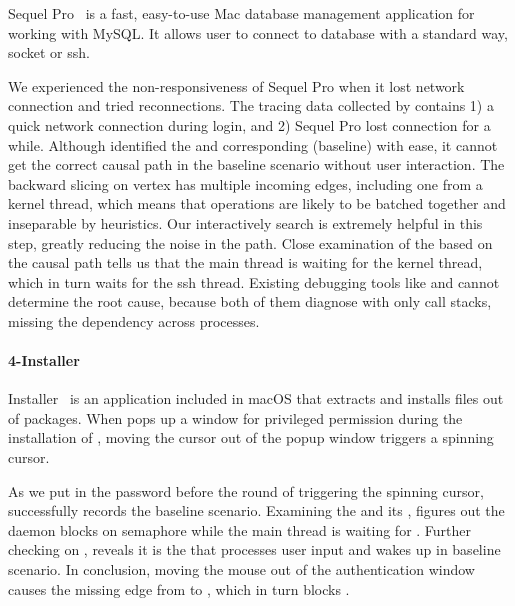 Sequel Pro~\cite{SequelPro} is a fast, easy-to-use Mac database management
application for working with MySQL. It allows user to connect to database with
a standard way, socket or ssh.

We experienced the non-responsiveness of Sequel Pro when it lost network
connection and tried reconnections. The tracing data collected by
\xxx contains 1) a quick network connection during login, and 2) Sequel Pro
lost connection for a while. Although \xxx identified the \spinningnode and
corresponding (baseline) \similarnode with ease, it cannot get the correct
causal path in the baseline scenario without user interaction. The backward
slicing on vertex has multiple incoming edges, including one from a kernel
thread, which means that operations are likely to be batched together and
inseparable by heuristics. Our interactively search is extremely helpful in
this step, greatly reducing the noise in the path. Close examination of the
\spinningnode based on the causal path tells us that the main thread is waiting
for the kernel thread, which in turn waits for the ssh thread. Existing
debugging tools like  and  cannot determine the root
cause, because both of them diagnose with only call stacks, missing the
dependency across processes.

\paragraph{4-Installer}

Installer~\cite{Installer} is an application included in macOS that extracts
and installs files out of  packages. When  pops up a
window for privileged permission during the installation of
, moving the cursor out of the popup window triggers a
spinning cursor.

As we put in the password before the round of triggering the spinning cursor,
\xxx successfully records the baseline scenario. Examining the \spinningnode
and its \similarnode, \xxx figures out the daemon  blocks on
semaphore while the main thread is waiting for . Further checking on
, \xxx reveals it is the  that processes user input
and wakes up  in baseline scenario. In conclusion, moving the mouse
out of the authentication window causes the missing edge from
 to , which in turn blocks .

